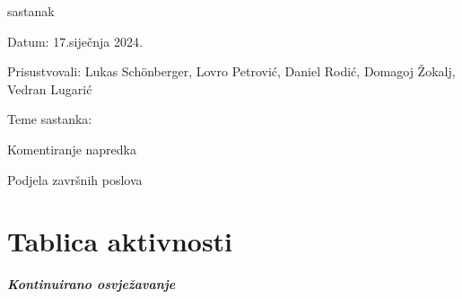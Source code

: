 \begin{packed_enum}
			\item  sastanak
			\item[] \begin{packed_item}
				\item Datum: 17.siječnja 2024.
				\item Prisustvovali: Lukas Schönberger, Lovro Petrović, Daniel Rodić, Domagoj Žokalj, Vedran Lugarić
				\item Teme sastanka:
				\begin{packed_item}
					\item  Komentiranje napredka
					\item  Podjela završnih poslova
				\end{packed_item}
			\end{packed_item}
			
			
		\end{packed_enum}
		
		\eject
		\section*{Tablica aktivnosti}
		
			\textbf{\textit{Kontinuirano osvježavanje}}\\

